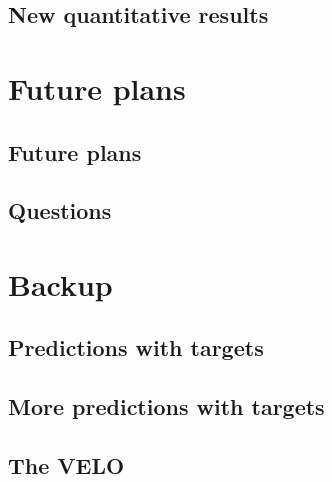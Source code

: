\documentclass[aspectratio=169, 10pt]{beamer}
\begin{document}
\subsection {New quantitative results}




\section{Future plans}

\subsection{Future plans}


\subsection{Questions}



\backupbegin
\section{Backup}

\subsection{Predictions with targets}


\subsection{More predictions with targets}


\subsection{The VELO}


\backupend
\end{document}
